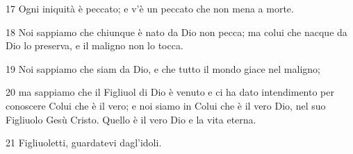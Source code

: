 \par 17 Ogni iniquità è peccato; e v'è un peccato che non mena a morte.
\par 18 Noi sappiamo che chiunque è nato da Dio non pecca; ma colui che nacque da Dio lo preserva, e il maligno non lo tocca.
\par 19 Noi sappiamo che siam da Dio, e che tutto il mondo giace nel maligno;
\par 20 ma sappiamo che il Figliuol di Dio è venuto e ci ha dato intendimento per conoscere Colui che è il vero; e noi siamo in Colui che è il vero Dio, nel suo Figliuolo Gesù Cristo. Quello è il vero Dio e la vita eterna.
\par 21 Figliuoletti, guardatevi dagl'idoli.


